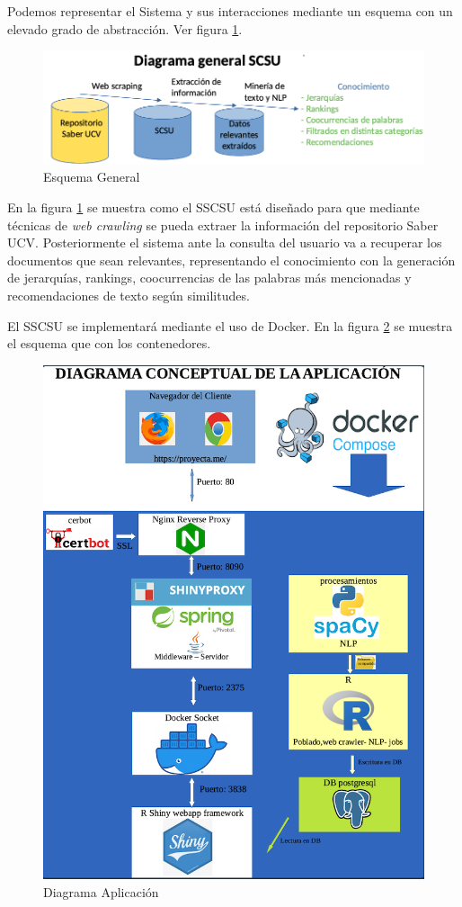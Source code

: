 \documentclass[
  10,
  openany]{book}
\begin{document}
Podemos representar el Sistema y sus interacciones mediante un esquema con un elevado grado de abstracción. Ver figura \ref{fig:esquema}.

\begin{figure}
\includegraphics[width=1\linewidth]{formas/diagramageneral} \caption{Esquema General}\label{fig:esquema}
\end{figure}

En la figura \ref{fig:esquema} se muestra como el SSCSU está diseñado para que mediante técnicas de \emph{web crawling} se pueda extraer la información del repositorio Saber UCV. Posteriormente el sistema ante la consulta del usuario va a recuperar los documentos que sean relevantes, representando el conocimiento con la generación de jerarquías, rankings, coocurrencias de las palabras más mencionadas y recomendaciones de texto según similitudes.

El SSCSU se implementará mediante el uso de Docker. En la figura \ref{fig:esquemadocker} se muestra el esquema que con los contenedores.

\begin{figure}
\includegraphics[width=0.9\linewidth]{formas/diagrama_docker2} \caption{Diagrama Aplicación}\label{fig:esquemadocker}
\end{figure}
\end{document}
